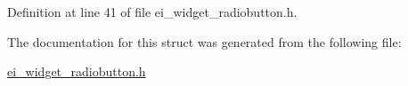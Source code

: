 Definition at line 41 of file ei\-\_\-widget\-\_\-radiobutton.\-h.



The documentation for this struct was generated from the following file\-:\begin{DoxyCompactItemize}
\item 
\hyperlink{ei__widget__radiobutton_8h}{ei\-\_\-widget\-\_\-radiobutton.\-h}\end{DoxyCompactItemize}
